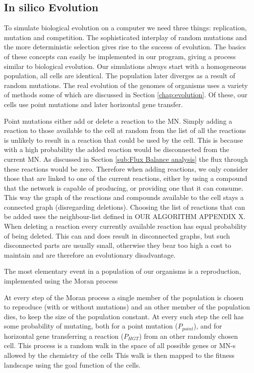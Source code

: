 \documentclass[a4paper,12pt]{article}
\begin{document}
\subsection{In silico Evolution}
\label{sub:implementing evolution}
To simulate biological evolution on a computer we need three things: replication, mutation and competition. The sophisticated interplay of random mutations and the more deterministic selection gives rise to the success of evolution. The basics of these concepts can easily be implemented in our program, giving a process similar to biological evolution. Our simulations always start with a homogeneous population, all cells are identical. The population later diverges as a result of random mutations. The real evolution of the genomes of organisms uses a variety of methods some of which are discussed in Section \ref{chap:evolution}. Of these, our cells use point mutations and later horizontal gene transfer.
	
	Point mutations either add or delete a reaction to the MN. Simply adding a reaction to those available to the cell at random from the list of all the reactions is unlikely to result in a reaction that could be used by the cell. This is because with a high probability the added reaction would be disconnected from the current MN. As discussed in Section \ref{sub:Flux Balance analysis} the flux through these reactions would be zero. Therefore when adding reactions, we only consider those that are linked  to one of the current reactions, either by using a compound that  the network is capable of producing, or providing one that it can consume. %
	This way the graph of the reactions and compounds available to the cell stays a connected graph (disregarding deletions). Choosing the list of reactions that can be added uses the neighbour-list defined in OUR ALGORITHM APPENDIX X. When deleting a reaction every currently available reaction has equal probability of being deleted. This can and does result in disconnected graphs, but such disconnected parts are usually small, otherwise they bear too high a cost to maintain and are therefore an evolutionary disadvantage.
	
The most elementary event in a population of our organisms is a reproduction, implemented using the Moran process \cite{moranprocess} 

At every step of the Moran process a single member of the population is chosen to reproduce (with or without mutations) and an other member of the population dies, to keep the size of the population constant. At every such step the cell has some probability of mutating, both for a point mutation ($P_{point}$), and for horizontal gene transferring a reaction ($P_{HGT}$) from an other randomly chosen cell.  This process is a random walk in the space of all possible genes or MN-s allowed by the chemistry of the cells  This walk is then mapped to the fitness landscape using the goal function of the cells.
\end{document}
